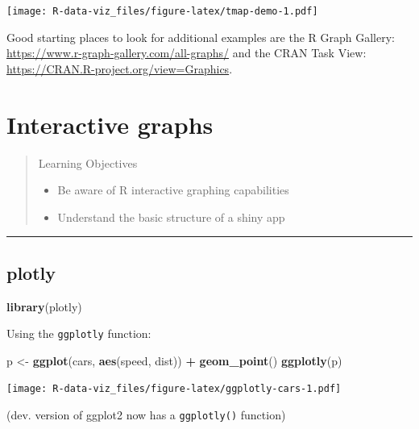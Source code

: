 \documentclass[]{book}
\newenvironment{Shaded}{\begin{snugshade}}{\end{snugshade}}
\newcommand{\KeywordTok}[1]{\textcolor[rgb]{0.13,0.29,0.53}{\textbf{#1}}}
\newcommand{\StringTok}[1]{\textcolor[rgb]{0.31,0.60,0.02}{#1}}
\newcommand{\OperatorTok}[1]{\textcolor[rgb]{0.81,0.36,0.00}{\textbf{#1}}}
\newcommand{\NormalTok}[1]{#1}
\providecommand{\tightlist}{%
  \setlength{\itemsep}{0pt}\setlength{\parskip}{0pt}}
\theoremstyle{definition}
\theoremstyle{definition}
\theoremstyle{definition}
\theoremstyle{remark}
\begin{document}
\texttt{[image: R-data-viz\_files/figure-latex/tmap-demo-1.pdf]}

Good starting places to look for additional examples are the R Graph
Gallery: \url{https://www.r-graph-gallery.com/all-graphs/} and the CRAN
Task View: \url{https://CRAN.R-project.org/view=Graphics}.

\chapter{Interactive graphs}\label{interactive-graphs}

\begin{quote}
Learning Objectives

\begin{itemize}
\tightlist
\item
  Be aware of R interactive graphing capabilities
\item
  Understand the basic structure of a shiny app
\end{itemize}
\end{quote}

\begin{center}\rule{0.5\linewidth}{\linethickness}\end{center}

\section{plotly}\label{plotly}

\begin{Shaded}
\begin{Highlighting}[]
\KeywordTok{library}\NormalTok{(plotly)}
\end{Highlighting}
\end{Shaded}

Using the \texttt{ggplotly} function:

\begin{Shaded}
\begin{Highlighting}[]
\NormalTok{p <-}\StringTok{ }\KeywordTok{ggplot}\NormalTok{(cars, }\KeywordTok{aes}\NormalTok{(speed, dist)) }\OperatorTok{+}\StringTok{ }\KeywordTok{geom_point}\NormalTok{()}
\KeywordTok{ggplotly}\NormalTok{(p)}
\end{Highlighting}
\end{Shaded}

\texttt{[image: R-data-viz\_files/figure-latex/ggplotly-cars-1.pdf]}

(dev. version of ggplot2 now has a \texttt{ggplotly()} function)
\end{document}
